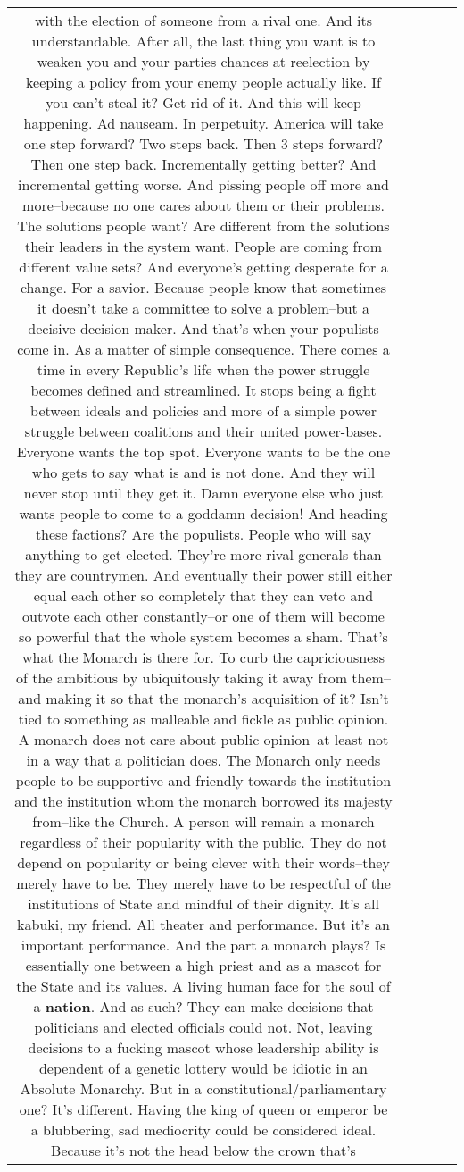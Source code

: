 \documentclass[11pt]{article}
\newlength\mylength
\begin{document}
\begin{center}
\begin{longtable}{|C{.65\mylength}|C{.30\mylength}|C{.12\mylength}|C{.12\mylength}|C{.12\mylength}|}
with the election of someone from a rival one. And its understandable. After all, the last thing you want is to weaken you and your parties chances at reelection by keeping a policy from your enemy people actually like. If you can't steal it? Get rid of it. And this will keep happening. Ad nauseam. In perpetuity. America will take one step forward? Two steps back. Then 3 steps forward? Then one step back. Incrementally getting better? And incremental getting worse.  And pissing people off more and more--because no one cares about them or their problems. The solutions people want? Are different from the solutions their leaders in the system want. People are coming from different value sets? And everyone's getting desperate for a change. For a savior. Because people know that sometimes it doesn't take a committee to solve a problem--but a decisive decision-maker. And that's when your populists come in. As a matter of simple consequence. There comes a time in every Republic's life when the power struggle becomes defined and streamlined. It stops being a fight between ideals and policies and more of a simple power struggle between coalitions and their united power-bases. Everyone wants the top spot. Everyone wants to be the one who gets to say what is and is not done. And they will never stop until they get it. Damn everyone else who just wants people to come to a goddamn decision! And heading these factions? Are the populists. People who will say anything to get elected. They're more rival generals than they are countrymen. And eventually their power still either equal each other so completely that they can veto and outvote each other constantly--or one of them will become so powerful that the whole system becomes a sham. That's what the Monarch is there for. To curb the capriciousness of the ambitious by ubiquitously taking it away from them--and making it so that the monarch's acquisition of it? Isn't tied to something as malleable and fickle as public opinion. A monarch  does not care about public opinion--at least not in a way that a politician does. The Monarch only needs people to be supportive and friendly towards the institution and the institution whom the monarch borrowed its majesty from--like the Church. A person will remain a monarch regardless of their popularity with the public. They do not depend on popularity or being clever with their words--they merely have to be. They merely have to be respectful of the institutions of State and mindful of their dignity. It's all kabuki, my friend. All theater and performance. But it's an important performance. And the part a monarch plays? Is essentially one between a high priest and as a mascot for the State and its values. A living human face for the soul of a \textbf{nation}. And as such? They can make decisions that politicians and elected officials could not. Not, leaving decisions to a fucking mascot whose leadership ability is dependent of a genetic lottery would be idiotic in an Absolute Monarchy. But in a constitutional/parliamentary one? It's different. Having the king of queen or emperor be a blubbering, sad mediocrity could be considered ideal. Because it's not the head below the crown that's 
\end{longtable}
\end{center}
\end{document}
